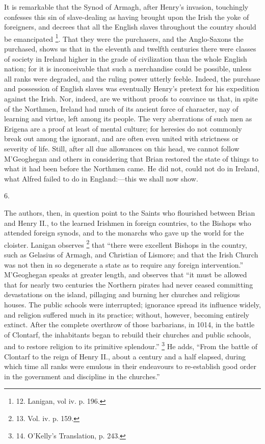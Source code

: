 It is remarkable that the
Synod of Armagh, after Henry's invasion, touchingly confesses this sin
of slave-dealing as having brought upon the Irish the yoke of
foreigners, and decrees that all the English slaves throughout the
country should be emancipated \footnote{12.
Lanigan, vol iv. p. 196.}. That they were the purchasers, and the Anglo-Saxons the
purchased, shows us that in the eleventh and twelfth centuries there
were classes of society in Ireland higher in the grade of civilization
than the whole English nation; for it is inconceivable that such a
merchandise could be possible, unless all ranks were degraded, and the
ruling power utterly feeble. Indeed, the purchase and possession of
English slaves was eventually Henry's pretext for his expedition
against the Irish. Nor, indeed, are we without proofs to convince us
that, in spite of the Northmen, Ireland had much of its ancient
force of character, nay of learning and virtue, left among its people.
The very aberrations of such men as Erigena are a proof at least of
mental culture; for heresies do not commonly break out among the
ignorant, and are often even united with strictness or severity of
life. Still, after all due allowances on this head, we cannot follow M'Geoghegan
and others in considering that Brian restored the state of things to
what it had been before the Northmen came. He did not, could not do in
Ireland, what Alfred failed to do in England:—this we shall now
show.

6.

The authors, then, in question
point to the Saints who flourished between Brian and Henry II., to the
learned Irishmen in foreign countries, to the Bishops who attended
foreign synods, and to the monarchs who gave up the world for the
cloister. Lanigan observes \footnote{13.
Vol. iv. p. 159.}
that ``there were excellent Bishops in the country, such as Gelasius of
Armagh, and Christian of Lismore; and that the Irish Church was not
then in so degenerate a state as to require any foreign intervention.''
M'Geoghegan speaks at greater length, and observes that ``it must be
allowed that for nearly two centuries the Northern pirates had never
ceased committing devastations on the island, pillaging and burning
her churches and religious houses. The public schools were
interrupted; ignorance spread its influence widely, and religion
suffered much in its practice; without, however, becoming entirely
extinct. After the complete overthrow of those barbarians, in 1014, in
the battle of Clontarf, the inhabitants began to rebuild their
churches and public schools, and to restore religion to its primitive
splendour.'' \footnote{14.
O'Kelly's Translation, p. 243.} He
adds, ``From the battle of Clontarf to the reign of Henry II., about a
century and a half elapsed, during which time all ranks were emulous
in their endeavours to re-establish good order in the government and
discipline in the churches.''

